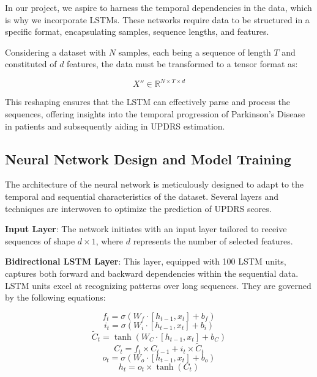 In our project, we aspire to harness the temporal dependencies in the data, which is why we incorporate LSTMs. These networks require data to be structured in a specific format, encapsulating samples, sequence lengths, and features.

Considering a dataset with $N$ samples, each being a sequence of length $T$ and constituted of $d$ features, the data must be transformed to a tensor format as:

\begin{equation}
    X'' \in \mathbb{R}^{N \times T \times d}
\end{equation}



This reshaping ensures that the LSTM can effectively parse and process the sequences, offering insights into the temporal progression of Parkinson's Disease in patients and subsequently aiding in UPDRS estimation.



\subsection{Neural Network Design and Model Training}

The architecture of the neural network is meticulously designed to adapt to the temporal and sequential characteristics of the dataset. Several layers and techniques are interwoven to optimize the prediction of UPDRS scores.

\textbf{Input Layer}: The network initiates with an input layer tailored to receive sequences of shape $d \times 1$, where $d$ represents the number of selected features.

\textbf{Bidirectional LSTM Layer}: This layer, equipped with 100 LSTM units, captures both forward and backward dependencies within the sequential data. LSTM units excel at recognizing patterns over long sequences. They are governed by the following equations:

\begin{equation}
f_t = \sigma(W_f \cdot [h_{t-1}, x_t] + b_f)
\end{equation}
\begin{equation}
i_t = \sigma(W_i \cdot [h_{t-1}, x_t] + b_i)
\end{equation}
\begin{equation}
\tilde{C}_t = \tanh(W_C \cdot [h_{t-1}, x_t] + b_C)
\end{equation}
\begin{equation}
C_t = f_t \times C_{t-1} + i_t \times \tilde{C}_t
\end{equation}
\begin{equation}
o_t = \sigma(W_o \cdot [h_{t-1}, x_t] + b_o)
\end{equation}
\begin{equation}
h_t = o_t \times \tanh(C_t)
\end{equation}

